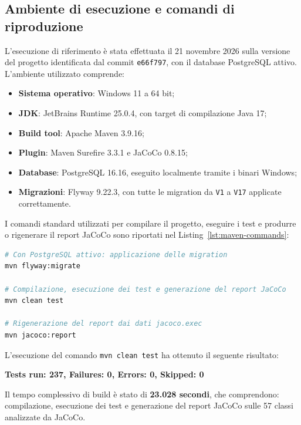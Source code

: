 \subsection{Ambiente di esecuzione e comandi di riproduzione}
\label{sec:ambiente-comandi}
L'esecuzione di riferimento è stata effettuata il 21 novembre 2026
sulla versione del progetto identificata dal commit
\texttt{e66f797}, con il database PostgreSQL attivo.
L'ambiente utilizzato comprende:
\begin{itemize}
    \item \textbf{Sistema operativo}: Windows 11 a 64 bit;
    \item \textbf{JDK}: JetBrains Runtime 25.0.4,
          con target di compilazione Java 17;
    \item \textbf{Build tool}: Apache Maven 3.9.16;
    \item \textbf{Plugin}: Maven Surefire 3.3.1 e JaCoCo 0.8.15;
    \item \textbf{Database}: PostgreSQL 16.16, eseguito localmente
          tramite i binari Windows;
    \item \textbf{Migrazioni}: Flyway 9.22.3,
          con tutte le migration da \texttt{V1} a \texttt{V17}
          applicate correttamente.
\end{itemize}

I comandi standard utilizzati per compilare il progetto, eseguire i test e produrre o rigenerare il report JaCoCo sono riportati nel Listing~\ref{lst:maven-commands}:
\begin{lstlisting}[language=bash, caption={Comandi Maven per l'esecuzione della suite di test e la generazione del report JaCoCo.}, label={lst:maven-commands}]
# Con PostgreSQL attivo: applicazione delle migration
mvn flyway:migrate

# Compilazione, esecuzione dei test e generazione del report JaCoCo
mvn clean test

# Rigenerazione del report dai dati jacoco.exec
mvn jacoco:report
\end{lstlisting}


L'esecuzione del comando \texttt{mvn clean test} ha ottenuto il seguente risultato:
\begin{center}
    \textbf{Tests run: 237, Failures: 0, Errors: 0, Skipped: 0}
\end{center}

Il tempo complessivo di build è stato di \textbf{23.028 secondi}, che comprendono: compilazione, esecuzione dei test e generazione del report JaCoCo sulle 57 classi analizzate da JaCoCo.

